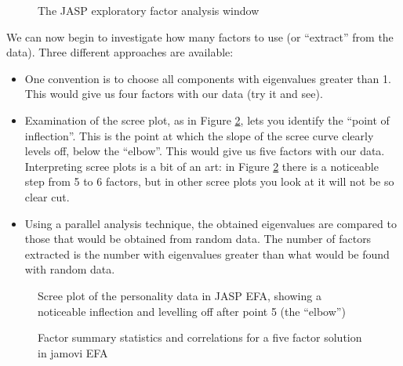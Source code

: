 \begin{figure}[!htb]
\begin{center}
\caption{The JASP exploratory factor analysis window}
\label{fig:fa3}
\HR
\end{center}
\end{figure}

We can now begin to investigate how many factors to use (or “extract” from the data). Three different approaches are available:

\begin{itemize} \itemsep -2pt
\item One convention is to choose all components with eigenvalues greater than 1. This would give us four factors with our data (try it and see). 
\item Examination of the scree plot, as in Figure \ref{fig:fa5}, lets you identify the “point of inflection”. This is the point at which the slope of the scree curve clearly levels off, below the “elbow”. This would give us five factors with our data. Interpreting scree plots is a bit of an art: in Figure \ref{fig:fa5} there is a noticeable step from 5 to 6 factors, but in other scree plots you look at it will not be so clear cut.
\item Using a parallel analysis technique, the obtained eigenvalues are compared to those that would be obtained from random data. The number of factors extracted is the number with eigenvalues greater than what would be found with random data. 
\end{itemize}

\begin{figure}[!htb]
\begin{center}
\caption{Scree plot of the personality data in JASP EFA, showing a noticeable inflection and levelling off after point 5 (the “elbow”)}
\label{fig:fa5}
\HR
\end{center}
\end{figure}

\begin{figure}[!htb]
\begin{center}
\caption{Factor summary statistics and correlations for a five factor solution in jamovi EFA}
\label{fig:fa6}
\HR
\end{center}
\end{figure}

